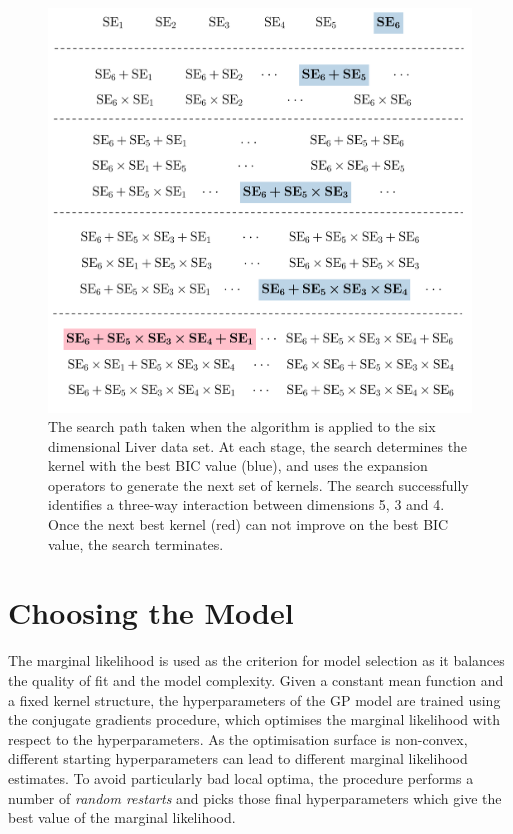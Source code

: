 \documentclass[a4paper,12pt ]{report}
\begin{document}
\begin{figure} [h]
   \caption{{The search path taken when the algorithm is applied to the six dimensional Liver data set. At each stage, the search determines the kernel with the best BIC value (blue), and uses the expansion operators to generate the next set of kernels. The search successfully identifies a three-way interaction between dimensions 5, 3 and 4. Once the next best kernel (red) can not improve on the best BIC value, the search terminates. ~~~~~~~~~~~~~ }}
  \centering
 \includegraphics[trim=0cm 0cm 0cm 0cm, width=1\textwidth] {figures/search.png}

\end{figure}


\clearpage

\section{Choosing the Model}


The marginal likelihood is used as the criterion for model selection as it balances the quality of fit and the model complexity. Given a constant mean function and a fixed kernel structure, the hyperparameters of the GP model are trained using the conjugate gradients procedure, which optimises the marginal likelihood with respect to the hyperparameters. As the optimisation surface is non-convex, different starting hyperparameters can lead to different marginal likelihood estimates. To avoid particularly bad local optima, the procedure performs a number of \emph{random restarts} and picks those final hyperparameters which give the best value of the marginal likelihood.
\end{document}
